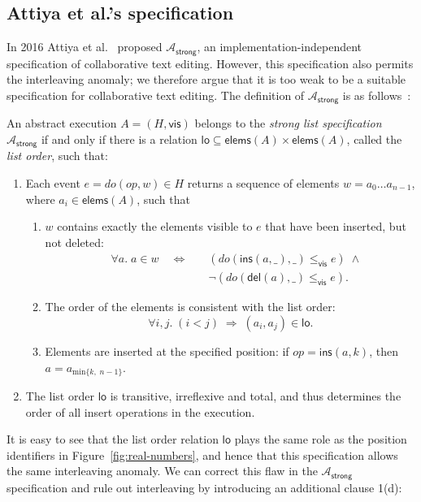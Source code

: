 \documentclass[sigconf]{acmart}
\begin{document}
\subsection{Attiya et al.'s specification}\label{sec:attiya-spec}

In 2016 Attiya et al.~\cite{Attiya:2016kh} proposed $\mathcal{A}_\textsf{strong}$, an implementation-independent specification of collaborative text editing.
However, this specification also permits the interleaving anomaly; we therefore argue that it is too weak to be a suitable specification for collaborative text editing.
The definition of $\mathcal{A}_\textsf{strong}$ is as follows~\cite{Attiya:2016kh}:

\begin{displayquote}
  An abstract execution $A = (H, \textsf{vis})$ belongs to the \emph{strong list specification} $\mathcal{A}_\textsf{strong}$ if and only if there is a relation $\textsf{lo} \subseteq \textsf{elems}(A) \times \textsf{elems}(A)$, called the \emph{list order}, such that:
  \begin{enumerate}
    \item Each event $e = \mathit{do}(\mathit{op}, w) \in H$ returns a sequence of elements $w=a_0 \dots a_{n-1}$, where $a_i \in \textsf{elems}(A)$, such that
    \begin{enumerate}
      \item $w$ contains exactly the elements visible to $e$ that have been inserted, but not deleted:
	    \begin{align*}
          \quad\forall a.\; a \in w \quad\Longleftrightarrow\quad &
		  (\mathit{do}(\textsf{ins}(a, \_), \_) \le_\textsf{vis} e) \;\wedge\\ &
		  \neg(\mathit{do}(\textsf{del}(a), \_) \le_\textsf{vis} e).
		\end{align*}
      \item The order of the elements is consistent with the list order:
        \[ \forall i, j.\; (i < j) \;\Longrightarrow\; (a_i, a_j) \in \textsf{lo}. \]
      \item Elements are inserted at the specified position:
        if $\mathit{op} = \textsf{ins}(a, k)$, then $a = a_{\mathrm{min} \{k,\; n-1\}}$.
    \end{enumerate}
    \item The list order $\textsf{lo}$ is transitive, irreflexive and total, and thus determines the order of all insert operations in the execution.
  \end{enumerate}
\end{displayquote}
It is easy to see that the list order relation $\textsf{lo}$ plays the same role as the position identifiers in Figure~\ref{fig:real-numbers}, and hence that this specification allows the same interleaving anomaly.
We can correct this flaw in the $\mathcal{A}_\textsf{strong}$ specification and rule out interleaving by introducing an additional clause 1(d):
\end{document}
